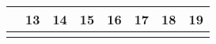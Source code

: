 {\begin{tabularx}{\linewidth}{|l!{\vrule width \myLenLineThicknessThick}*{7}{@{}X@{}|}}
      
        \\  \hline 
      
    
  
  
  
  \hyperlink{week-2027-50}{} &
    
      
      
        \begin{minipage}[t]{6mm}\centering{}13\end{minipage}
      
       & 
    
      
      
        \begin{minipage}[t]{6mm}\centering{}14\end{minipage}
      
       & 
    
      
      
        \begin{minipage}[t]{6mm}\centering{}15\end{minipage}
      
       & 
    
      
      
        \begin{minipage}[t]{6mm}\centering{}16\end{minipage}
      
       & 
    
      
      
        \begin{minipage}[t]{6mm}\centering{}17\end{minipage}
      
       & 
    
      
      
        \begin{minipage}[t]{6mm}\centering{}18\end{minipage}
      
       & 
    
      
      
        \begin{minipage}[t]{6mm}\centering{}19\end{minipage}
      
      
        \\  \hline 
      
    
  
  
  
  \hyperlink{week-2027-51}{} &
    

\end{tabularx}}
